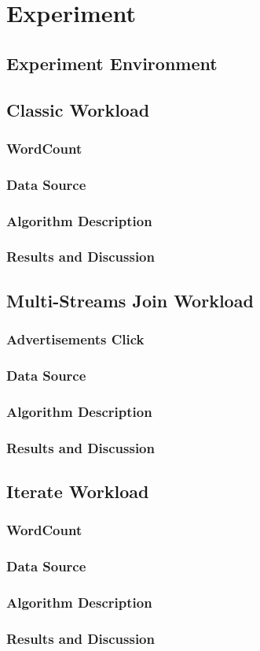 \chapter{Experiment}
\label{chapter:experiment}

\section{Experiment Environment}
\label{sec:triton}

\section{Classic Workload}
\subsection{WordCount}
\subsection{Data Source}
\subsection{Algorithm Description}
\subsection{Results and Discussion}

\section{Multi-Streams Join Workload}
\subsection{Advertisements Click}
\subsection{Data Source}
\subsection{Algorithm Description}
\subsection{Results and Discussion}

\section{Iterate Workload}
\subsection{WordCount}
\subsection{Data Source}
\subsection{Algorithm Description}
\subsection{Results and Discussion}

\clearpage